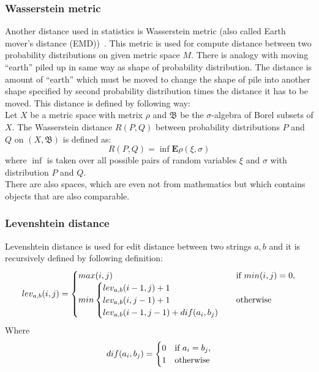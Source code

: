 \subsubsection{Wasserstein metric}
Another distance used in statistics is Wasserstein metric (also called Earth mover's distance (EMD))~\cite{Vallender73}. This metric is used for compute distance between two probability distributions on given metric space $M$. There is analogy with moving ``earth'' piled up in same way as shape of probability distribution. The distance is amount of ``earth'' which must be moved to change the shape of pile into another shape specified by second probability distribution times the distance it has to be moved. This distance is defined by following way:\\
Let $X$ be a metric space with metrix $\rho$ and $\mathfrak{B}$ be the $\sigma$-algebra of Borel subsets of $X$. The Wasserstein distance $R(P,Q)$ between probability distributions $P$ and $Q$ on $(X, \mathfrak{B})$ is defined as:
$$R(P,Q)=\inf\mathbf{E}\rho(\xi, \sigma)$$
where $\inf$ is taken over all possible pairs of random variables $\xi$ and $\sigma$ with distribution $P$ and $Q$.\\

There are also spaces, which are even not from mathematics but which contains objects that are also comparable.

\subsubsection{Levenshtein distance} Levenshtein distance is used for edit distance between two strings $a, b$ and it is recursively defined by following definition:
\begin{equation*}
lev_{a,b}(i,j)=
\begin{cases}
max(i,j) & $if $ min(i,j)=0, \cr
min \begin{cases}
lev_{a,b}(i-1,j) + 1 \cr
lev_{a,b}(i,j-1) + 1 \cr
lev_{a,b}(i-1,j-1) + dif(a_i,b_j)
\end{cases} & $otherwise$
\end{cases}
\end{equation*}
Where \begin{equation*}
dif(a_i,b_j)=
\begin{cases}
0 & $if $ a_i = b_j, \cr
1 & $otherwise$
\end{cases}
\end{equation*}

